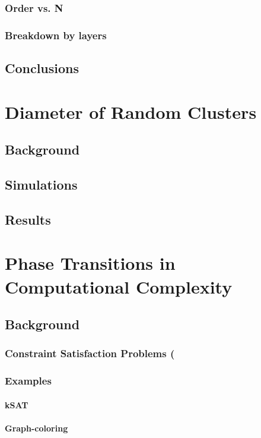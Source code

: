 \documentclass{umthesis}
\begin{document}
\subsection{Order vs. N}
\label{sec-2.3.2}
\subsection{Breakdown by layers}
\label{sec-2.3.3}
\section{Conclusions}
\label{sec-2.4}
\chapter{Diameter of Random Clusters}
\label{sec-3}
\section{Background}
\label{sec-3.1}
\section{Simulations}
\label{sec-3.2}
\section{Results}
\label{sec-3.3}
\chapter{Phase Transitions in Computational Complexity}
\label{sec-4}
\section{Background}
\label{sec-4.1}
\subsection{Constraint Satisfaction Problems (}
\label{sec-4.1.1}
\subsection{Examples}
\label{sec-4.1.2}
\subsubsection{kSAT}
\label{sec-4.1.3}
\subsubsection{Graph-coloring}
\label{sec-4.1.4}
\end{document}

